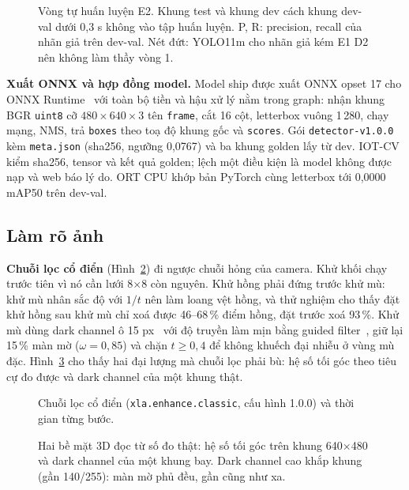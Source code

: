 \begin{figure}[!htbp]
\centering

\caption[Vòng tự huấn luyện E2]{Vòng tự huấn luyện E2. Khung test và khung dev cách khung dev-val dưới 0,3 s không vào tập huấn luyện. P, R: precision, recall của nhãn giả trên dev-val. Nét đứt: YOLO11m cho nhãn giả kém E1 D2 nên không làm thầy vòng 1.}
\label{fig:e2}
\end{figure}

\textbf{Xuất ONNX và hợp đồng model.} Model ship được xuất ONNX opset 17 cho ONNX Runtime~\cite{onnxrt} với toàn bộ tiền và hậu xử lý nằm trong graph: nhận khung BGR \texttt{uint8} cỡ $480\times640\times3$ tên \texttt{frame}, cắt 16 cột, letterbox vuông 1\,280, chạy mạng, NMS, trả \texttt{boxes} theo toạ độ khung gốc và \texttt{scores}. Gói \texttt{detector-v1.0.0} kèm \texttt{meta.json} (sha256, ngưỡng 0,0767) và ba khung golden lấy từ dev. IOT-CV kiểm sha256, tensor và kết quả golden; lệch một điều kiện là model không được nạp và web báo lý do. ORT CPU khớp bản PyTorch cùng letterbox tới 0,0000 mAP50 trên dev-val.

\subsection{Làm rõ ảnh}

\textbf{Chuỗi lọc cổ điển} (Hình~\ref{fig:classic}) đi ngược chuỗi hỏng của camera. Khử khối chạy trước tiên vì nó cần lưới 8$\times$8 còn nguyên. Khử hồng phải đứng trước khử mù: khử mù nhân sắc độ với $1/t$ nên làm loang vệt hồng, và thử nghiệm cho thấy đặt khử hồng sau khử mù chỉ xoá được 46–68\,\% điểm hồng, đặt trước xoá 93\,\%. Khử mù dùng dark channel ô 15 px~\cite{he-dcp} với độ truyền làm mịn bằng guided filter~\cite{guided}, giữ lại 15\,\% màn mờ ($\omega=0{,}85$) và chặn $t\geq0{,}4$ để không khuếch đại nhiễu ở vùng mù đặc. Hình~\ref{fig:surf3d} cho thấy hai đại lượng mà chuỗi lọc phải bù: hệ số tối góc theo tiêu cự đo được và dark channel của một khung thật.

\begin{figure}[!htbp]
\centering

\caption{Chuỗi lọc cổ điển (\texttt{xla.enhance.classic}, cấu hình 1.0.0) và thời gian từng bước.}
\label{fig:classic}
\end{figure}

\begin{figure}[!htbp]
\centering

\caption[Hai bề mặt 3D đọc từ số đo thật]{Hai bề mặt 3D đọc từ số đo thật: hệ số tối góc trên khung 640$\times$480 và dark channel của một khung bay. Dark channel cao khắp khung (gần 140/255): màn mờ phủ đều, gần cũng như xa.}
\label{fig:surf3d}
\end{figure}

